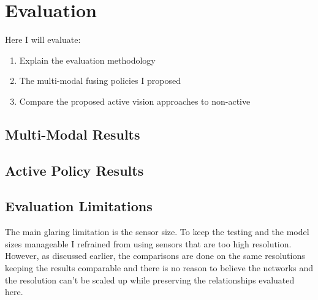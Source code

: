\chapter{Evaluation}\label{ch:eval}
Here I will evaluate:
\begin{enumerate}
  \item Explain the evaluation methodology
  \item The multi-modal fusing policies I proposed
  \item Compare the proposed active vision approaches to non-active
\end{enumerate}





\section{Multi-Modal Results}

  

  
  
  

  

  
  
  

  


\section{Active Policy Results}\todo[color=red]{}


\section{Evaluation Limitations}\todo[color=red]{}
The main glaring limitation is the sensor size. To keep the testing and the model sizes manageable I refrained from using sensors that are too high resolution. However, as discussed earlier, the comparisons are done on the same resolutions keeping the results comparable and there is no reason to believe the networks and the resolution can't be scaled up while preserving the relationships evaluated here.



